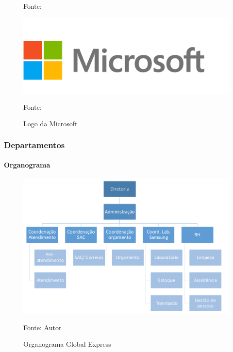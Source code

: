 \documentclass[aspectratio=169]{beamer}
\begin{document}
\begin{frame}
\begin{minipage}[!h]{.3\textwidth}
\begin{figure}
				\footnotesize{Fonte: }
				\label{logsony}
				
				\centering
				\caption{Logo da Microsoft}
				
				\includegraphics[width=.65\linewidth]{logo_microsoft.png}
				
				\footnotesize{Fonte: }
				\label{logmicro}
			\end{figure} 	
		\end{minipage}
	\end{frame}
	
	\begin{frame}
		\frametitle{Departamentos}
		\framesubtitle{Organograma}
		
		\begin{figure}
			\centering
			\caption{Organograma Global Express}
			
			\includegraphics[width=0.5	\linewidth]{organograma_global.png} 
			
			\footnotesize{Fonte: Autor}
			\label{im1}
		\end{figure}	
	\end{frame}
	
\end{document}
